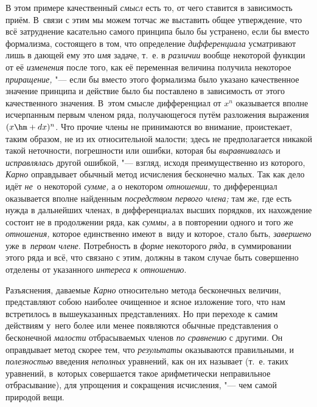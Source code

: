 В этом примере качественный {\em смысл} есть то, от чего ставится в зависимость
приём. В~связи с этим мы можем тотчас же выставить общее утверждение, что всё
затруднение касательно самого принципа было бы устранено, если бы вместо
формализма, состоящего в том, что определение {\em дифференциала} усматривают
лишь в дающей ему это {\em имя} задаче, т.~е. в {\em различии} вообще некоторой
функции от её {\em изменения} после того, как её переменная величина получила
некоторое {\em приращение,} "--- если бы вместо этого формализма было указано
качественное значение принципа и действие было бы поставлено в зависимость от
этого качественного значения. В~этом смысле дифференциал от $x^n$ оказывается
вполне исчерпанным первым членом ряда, получающегося путём разложения выражения
$(x\hm+dx)^n$. Что прочие члены не принимаются во внимание, проистекает, таким
образом, не из их относительной малости; здесь не предполагается никакой такой
неточности, погрешности или ошибки, которая бы {\em выравнивалась} и
{\em исправлялась} другой ошибкой, "--- взгляд, исходя преимущественно из
которого, {\em Карно} оправдывает обычный метод исчисления бесконечно малых.
Так как дело идёт {\em не}~о некоторой {\em сумме,} а о некотором
{\em отношении,} то дифференциал оказывается вполне найденным {\em посредством
первого члена;} там же, где есть нужда в дальнейших членах, в дифференциалах
высших порядков, их нахождение состоит не в продолжении ряда, как {\em суммы,}
а в повторении одного и того же {\em отношения,} которое единственно имеют
в~виду и которое, стало быть, {\em завершено} уже в~{\em первом члене}.
Потребность в {\em форме} некоторого {\em ряда,} в суммировании этого ряда и
всё, что связано с этим, должны в таком случае быть совершенно отделены от
указанного {\em интереса к отношению}.

Разъяснения, даваемые {\em Карно} относительно метода бесконечных величин,
представляют собою наиболее очищенное и ясное изложение того, что нам
встретилось в вышеуказанных представлениях. Но при переходе к самим действиям
у~него более или менее появляются обычные представления о бесконечной
{\em малости} отбрасываемых членов {\em по сравнению} с другими. Он
оправдывает метод скорее тем, что {\em результаты} оказываются правильными,
и {\em полезностью} введения {\em неполных} уравнений, как он их называет
(т.~е. таких уравнений, в~которых совершается такое арифметически неправильное
отбрасывание), для упрощения и сокращения исчисления, "--- чем самой
природой вещи.

